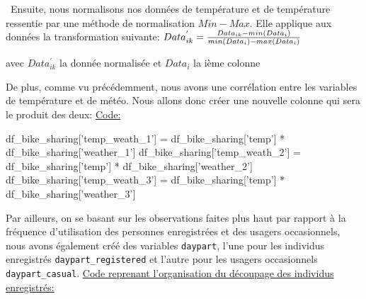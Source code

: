 \documentclass[a4paper,oneside,11pt]{article}
\begin{document}
\ Ensuite, nous normalisons nos données de température et de température ressentie par une méthode de normalisation $Min-Max$. Elle applique aux données la transformation suivante:
$Data_{ik}^{'}=\frac{Data_{ik}-min(Data_i)}{min(Data_i)-max(Data_i)}\newline$

avec $Data_{ik}^{'}$ la donnée normalisée et $Data_i$ la ième colonne


De plus, comme vu précédemment, nous avons une corrélation entre les variables de température et de météo. Nous allons donc créer une nouvelle colonne qui sera le produit des deux: \newline
\underline{Code:}
\begin{code-Python}
df_bike_sharing['temp_weath_1'] = df_bike_sharing['temp'] * df_bike_sharing['weather_1']
df_bike_sharing['temp_weath_2'] = df_bike_sharing['temp'] * df_bike_sharing['weather_2']
df_bike_sharing['temp_weath_3'] = df_bike_sharing['temp'] * df_bike_sharing['weather_3']
\end{code-Python} 
Par ailleurs, on se basant sur les observations faites plus haut par rapport à la fréquence d'utilisation des personnes enregistrées et des usagers occasionnels, nous avons également créé des variables \verb+daypart+, l'une pour les individus enregistrés \verb+daypart_registered+ et l'autre pour les usagers occasionnels \verb+daypart_casual+. \newline
\underline{Code reprenant l'organisation du découpage des individus enregistrés:}
\end{document}
